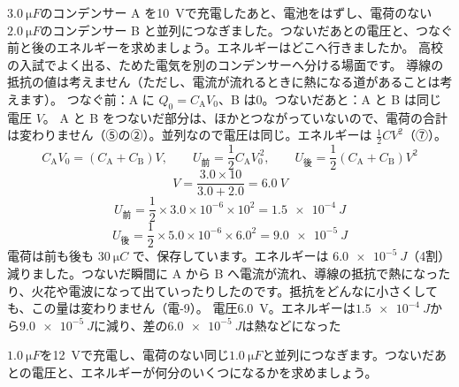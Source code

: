 \label{ph:電-3:ex6}
\begin{phreidai}[コンデンサーのつなぎかえ]
$\qty{3.0}{\micro F}$のコンデンサー A を\qty{10}{V}で充電したあと、電池をはずし、電荷のない$\qty{2.0}{\micro F}$のコンデンサー B と並列につなぎました。つないだあとの電圧と、つなぐ前と後のエネルギーを求めましょう。エネルギーはどこへ行きましたか。
\phbamen
高校の入試でよく出る、ためた電気を別のコンデンサーへ分ける場面です。
\phmushi
導線の抵抗の値は考えません（ただし、電流が流れるときに熱になる道があることは考えます）。
\phzu
つなぐ前：A に $Q_0=C_{\mathrm A}V_0$、B は0。つないだあと：A と B は同じ電圧 $V$。
\phriyu
A と B をつないだ部分は、ほかとつながっていないので、電荷の合計は変わりません（⑤の②）。並列なので電圧は同じ。エネルギーは $\tfrac12CV^2$（⑦）。
\phtateru
\[C_{\mathrm A}V_0=(C_{\mathrm A}+C_{\mathrm B})V,\qquad U_{\text{前}}=\frac12C_{\mathrm A}V_0^{\,2},\qquad U_{\text{後}}=\frac12(C_{\mathrm A}+C_{\mathrm B})V^2\]
\phtoku
\[V=\frac{3.0\times10}{3.0+2.0}=\qty{6.0}{V}\]
\[U_{\text{前}}=\frac12\times3.0\times10^{-6}\times10^2=\qty{1.5e-4}{J}\]
\[U_{\text{後}}=\frac12\times5.0\times10^{-6}\times6.0^2=\qty{9.0e-5}{J}\]
\phtashikame
電荷は前も後も $\qty{30}{\micro C}$ で、保存しています。エネルギーは $\qty{6.0e-5}{J}$（4割）減りました。つないだ瞬間に A から B へ電流が流れ、導線の抵抗で熱になったり、火花や電波になって出ていったりしたのです。抵抗をどんなに小さくしても、この量は変わりません（電-9）。
\kotae 電圧\qty{6.0}{V}。エネルギーは$\qty{1.5e-4}{J}$から$\qty{9.0e-5}{J}$に減り、差の$\qty{6.0e-5}{J}$は熱などになった
\end{phreidai}
\begin{jibun}
$\qty{1.0}{\micro F}$を\qty{12}{V}で充電し、電荷のない同じ$\qty{1.0}{\micro F}$と並列につなぎます。つないだあとの電圧と、エネルギーが何分のいくつになるかを求めましょう。
\end{jibun}

